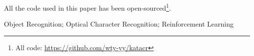 \noindent All the code used in this paper has been open-sourced\footnote{All code: \url{https://github.com/wty-yy/katacr}}.

\vspace{\baselineskip}
 Object Recognition; Optical Character Recognition; Reinforcement Learning


\titlespacing{\chapter}{0pt}{-6mm}{5mm}
\clearpage{\pagestyle{empty}\cleardoublepage}
